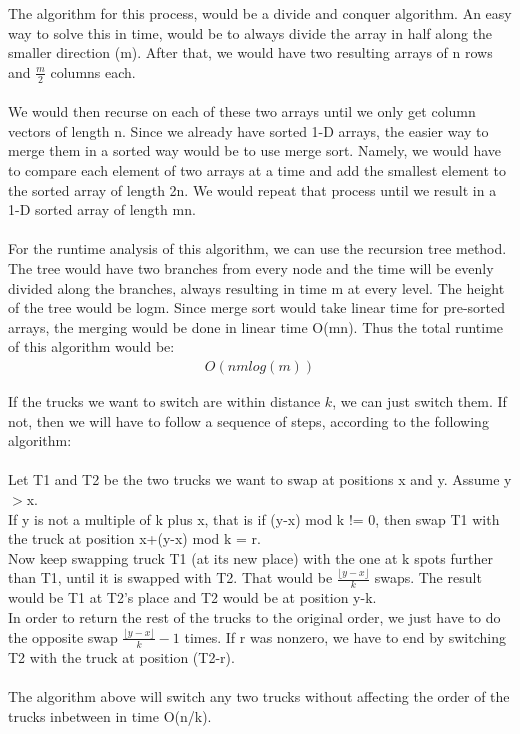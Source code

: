 \documentclass[12pt,twoside]{article}
\begin{document}
\begin{problems}
\problem  %

\begin{problemparts}
\problempart
The algorithm for this process, would be a divide and conquer algorithm. An easy way to solve this in time, would be to always divide the array in half along the smaller direction (m). After that, we would have two resulting arrays of n rows and $\frac{m}{2}$ columns each. 
\\\\
We would then recurse on each of these two arrays until we only get column vectors of length n. Since we already have sorted 1-D arrays, the easier way to merge them in a sorted way would be to use merge sort. Namely, we would have to compare each element of two arrays at a time and add the smallest element to the sorted array of length 2n. 
We would repeat that process until we result in a 1-D sorted array of length mn.\\\\
For the runtime analysis of this algorithm, we can use the recursion tree method. The tree would have two branches from every node and the time will be evenly divided along the branches, always resulting in time m at every level. The height of the tree would be logm. Since merge sort would take linear time for pre-sorted arrays, the merging would be done in linear time O(mn). Thus the total runtime of this algorithm would be:
\begin{align*}
O(nm log(m))
\end{align*}
\end{problemparts}

\problem  %

\begin{problemparts}
\problempart 
If the trucks we want to switch are within distance $k$, we can just switch them. If not, then we will have to follow a sequence of steps, according to the following algorithm:
\\\\
Let T1 and T2 be the two trucks we want to swap at positions x and y. Assume y$>$x. 
\\
If y is not a multiple of k plus x, that is if (y-x) mod k != 0, then swap T1 with the truck at position x+(y-x) mod k = r.
\\
Now keep swapping truck T1 (at its new place) with the one at k spots further than T1, until it is swapped with T2. That would be $\frac{\lfloor y-x \rfloor}{k}$ swaps. The result would be T1 at T2's place and T2 would be at position y-k.
\\
 In order to return the rest of the trucks to the original order, we just have to do the opposite swap $\frac{\lfloor y-x \rfloor}{k} -1$ times.  If r was nonzero, we have to end by switching T2 with the truck at position (T2-r).
\\\\
The algorithm above will switch any two trucks without affecting the order of the trucks inbetween in time O(n/k).


\end{problemparts}
\end{problems}
\end{document}
